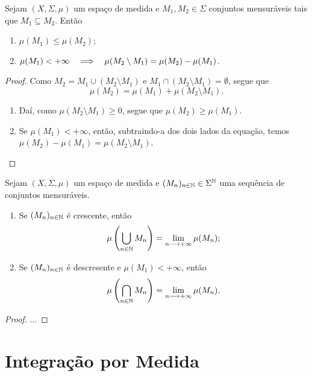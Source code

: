 \begin{prop}
Sejam $(X, \Sigma,\mu)$ um espaço de medida e $M_1,M_2 \in \Sigma$ conjuntos mensuráveis tais que $M_1 \subseteq M_2$. Então
	\begin{enumerate}
	\item $\mu(M_1) \leq \mu(M_2)$;
	\item $\mu(M_1) < + \infty \quad \Longrightarrow \quad \mu(M_2 \setminus M_1) = \mu(M_2) - \mu(M_1)$.
	\end{enumerate}
\end{prop}
\begin{proof}
	Como $M_2 = M_1 \cup (M_2 \setminus M_1)$ e $M_1 \cap (M_2 \setminus M_1) = \emptyset$, segue que
	\begin{equation*}
	\mu(M_2)=\mu(M_1)+\mu(M_2 \setminus M_1).
	\end{equation*}
	\begin{enumerate}
	\item Daí, como $\mu(M_2 \setminus M_1) \geq 0$, segue que $\mu(M_2) \geq \mu(M_1)$.
	\item Se $\mu(M_1) < + \infty$, então, subtraindo-a dos dois lados da equação, temos $\mu(M_2)-\mu(M_1)=\mu(M_2 \setminus M_1)$.
	\end{enumerate}
\end{proof}

\begin{prop}
Sejam $(X, \Sigma,\mu)$ um espaço de medida e $(M_n)_{n \in \mathbb{N}} \in \Sigma^{\mathbb{N}}$ uma sequência de conjuntos mensuráveis.
	\begin{enumerate}
	\item Se $(M_n)_{n \in \mathbb{N}}$ é crescente, então
		\begin{equation*}
		\mu \left( \bigcup_{n \in \mathbb{N}} M_n \right) = \lim_{n \longrightarrow +\infty} \mu(M_n);
		\end{equation*}
	\item Se $(M_n)_{n \in \mathbb{N}}$ é descresente e $\mu(M_1) < + \infty$, então
		\begin{equation*}
		\mu \left( \bigcap_{n \in \mathbb{N}} M_n \right) = \lim_{n \longrightarrow +\infty} \mu(M_n).
		\end{equation*}
	\end{enumerate}
\end{prop}
\begin{proof}
	...
\end{proof}





\chapter{Integração por Medida}

